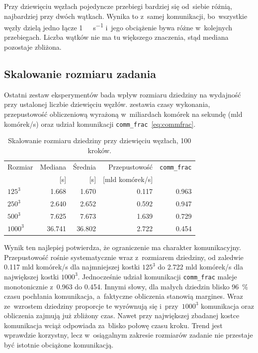 Przy dziewięciu węzłach pojedyncze przebiegi bardziej się od~siebie różnią, najbardziej przy
dwóch wątkach. Wynika to z~samej komunikacji, bo~wszystkie węzły dzielą jedno łącze
\SI{1}{\giga\bit\per\second} i~jego obciążenie bywa różne w~kolejnych przebiegach. Liczba
wątków nie ma tu większego znaczenia, stąd mediana pozostaje zbliżona.

\subsection{Skalowanie rozmiaru zadania}
\label{subsec:skalowanie-rozmiar}

Ostatni zestaw eksperymentów bada wpływ rozmiaru dziedziny na wydajność przy
ustalonej liczbie dziewięciu węzłów.  zestawia czasy
wykonania, przepustowość obliczeniową wyrażoną w~miliardach komórek na sekundę
(mld komórek/s) oraz udział komunikacji \texttt{comm\_frac}~\eqref{eq:commfrac}.

\begin{table}[htbp]
\centering
\caption{Skalowanie rozmiaru dziedziny przy dziewięciu węzłach, \num{100}
kroków.}
\label{tab:cube-size}
\begin{tabular}{lrrrr}
\toprule
Rozmiar & Mediana & Średnia & Przepustowość & \texttt{comm\_frac} \\
& [s] & [s] & [mld komórek/s] & \\
\midrule
$125^3$  & \num{1.668}   & \num{1.670}   & \num{0.117} & \num{0.963} \\
$250^3$  & \num{2.640}   & \num{2.652}   & \num{0.592} & \num{0.947} \\
$500^3$  & \num{7.625}   & \num{7.673}   & \num{1.639} & \num{0.729} \\
$1000^3$ & \num{36.741}  & \num{36.802}  & \num{2.722} & \num{0.454} \\
\bottomrule
\end{tabular}
\end{table}

Wynik ten najlepiej potwierdza, że ograniczenie ma charakter komunikacyjny.
Przepustowość rośnie systematycznie wraz z~rozmiarem dziedziny, od zaledwie
\num{0.117} mld komórek/s dla najmniejszej kostki $125^3$ do \num{2.722} mld komórek/s
dla największej kostki $1000^3$. Jednocześnie udział komunikacji
\texttt{comm\_frac} maleje monotonicznie z~\num{0.963} do \num{0.454}. Innymi
słowy, dla małych dziedzin blisko \SI{96}{\percent} czasu pochłania
komunikacja, a~faktyczne obliczenia stanowią margines. Wraz ze~wzrostem dziedziny
proporcje te wyrównują się i~przy~$1000^3$ komunikacja oraz obliczenia zajmują już
zbliżony czas. Nawet przy największej zbadanej kostce
komunikacja wciąż odpowiada za~blisko połowę czasu kroku. Trend jest wprawdzie
korzystny, lecz w~osiągalnym zakresie rozmiarów zadanie nie przestaje być istotnie
obciążone komunikacją.

